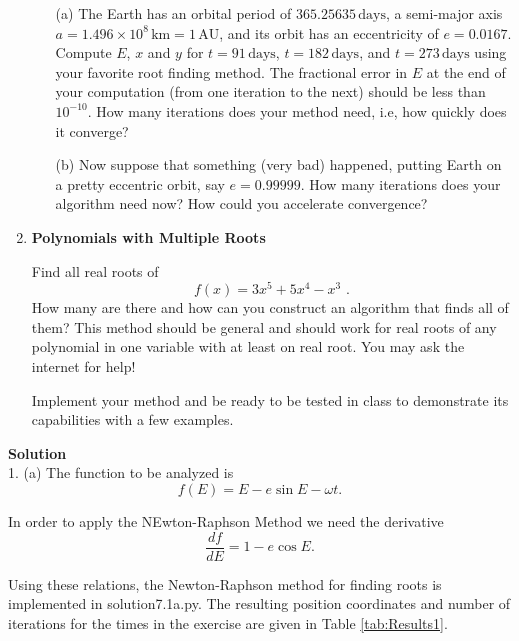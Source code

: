 \documentclass[11pt]{article}
\begin{document}
\begin{enumerate}
\begin{enumerate}
\item[(a)] The Earth has an orbital period of $365.25635\,\text{days}$,
a semi-major axis $a = 1.496\times 10^8\,\mathrm{km} = 1\,\mathrm{AU}$,
and its orbit has an eccentricity of $e = 0.0167$. Compute $E$, $x$ and $y$
for $t = 91\,\text{days}$, $t = 182\,\text{days}$, and $t = 273\,\text{days}$
using your favorite root finding method. The fractional error in $E$ at the end
of your computation (from one iteration to the next) should be less than
$10^{-10}$. How many iterations does your method need, i.e, how quickly does it
converge?

\item[(b)] Now suppose that something (very bad) happened,
  putting Earth on a pretty eccentric orbit, say $e = 0.99999$. How
  many iterations does your algorithm need now? How could you
  accelerate convergence?
\end{enumerate}

\item {\bf Polynomials with Multiple Roots}

Find all real roots of
\begin{equation}
f(x) = 3x^5 + 5x^4 - x^3\,\,.
\end{equation}
How many are there and how can you construct an algorithm that finds
all of them? This method should be general and should work for real
roots of any polynomial in one variable with at least on real
root. You may ask the internet for help!

Implement your method and be ready to be tested in class to demonstrate its capabilities
with a few examples.
\end{enumerate}

\textbf{Solution}\\
1. (a) The function to be analyzed is
\begin{equation}
f(E) = E- e \sin E - \omega t. 
\end{equation}

In order to apply the NEwton-Raphson Method we need the derivative
\begin{equation}
\frac{df}{dE} = 1-e \cos E.
\end{equation}

Using these relations, the Newton-Raphson method for finding roots is implemented in solution7.1a.py. The resulting position coordinates and number of iterations for the times in the exercise are given in Table \ref{tab:Results1}. 
\end{document}
